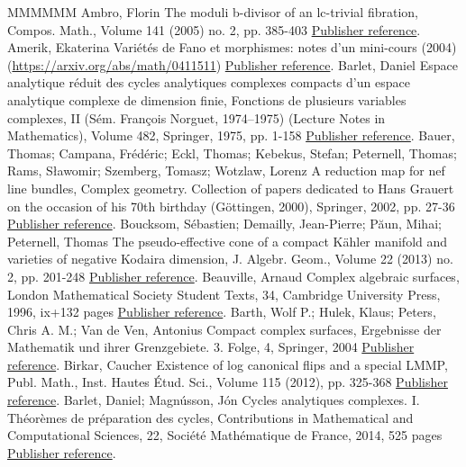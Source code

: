\documentclass[11pt]{article}
\theoremstyle{definition}
\numberwithin{equation}{section}
\numberwithin{figure}{section}
\numberwithin{table}{section}
\begin{document}
\begin{thebibliography}{MMMMMM}
 Ambro, Florin The moduli b-divisor of an lc-trivial fibration, Compos. Math., Volume 141 (2005) no. 2, pp. 385-403 \href{https://ahl.centre-mersenne.org/item/AHL_2020__3__473_0/#Amb05a}{Publisher reference}.
 Amerik, Ekaterina Variétés de Fano et morphismes: notes d’un mini-cours (2004) (\url{https://arxiv.org/abs/math/0411511}) \href{https://ahl.centre-mersenne.org/item/AHL_2020__3__473_0/#Ame04}{Publisher reference}.
 Barlet, Daniel Espace analytique réduit des cycles analytiques complexes compacts d’un espace analytique complexe de dimension finie, Fonctions de plusieurs variables complexes, II (Sém. François Norguet, 1974–1975) (Lecture Notes in Mathematics), Volume 482, Springer, 1975, pp. 1-158 \href{https://ahl.centre-mersenne.org/item/AHL_2020__3__473_0/#Bar75}{Publisher reference}.
 Bauer, Thomas; Campana, Frédéric; Eckl, Thomas; Kebekus, Stefan; Peternell, Thomas; Rams, Sławomir; Szemberg, Tomasz; Wotzlaw, Lorenz A reduction map for nef line bundles, Complex geometry. Collection of papers dedicated to Hans Grauert on the occasion of his 70th birthday (Göttingen, 2000), Springer, 2002, pp. 27-36 \href{https://ahl.centre-mersenne.org/item/AHL_2020__3__473_0/#BCE+}{Publisher reference}.
 Boucksom, Sébastien; Demailly, Jean-Pierre; Păun, Mihai; Peternell, Thomas The pseudo-effective cone of a compact Kähler manifold and varieties of negative Kodaira dimension, J. Algebr. Geom., Volume 22 (2013) no. 2, pp. 201-248 \href{https://ahl.centre-mersenne.org/item/AHL_2020__3__473_0/#BDPP}{Publisher reference}.
 Beauville, Arnaud Complex algebraic surfaces, London Mathematical Society Student Texts, 34, Cambridge University Press, 1996, ix+132 pages \href{https://ahl.centre-mersenne.org/item/AHL_2020__3__473_0/#Bea96}{Publisher reference}.
 Barth, Wolf P.; Hulek, Klaus; Peters, Chris A. M.; Van de Ven, Antonius Compact complex surfaces, Ergebnisse der Mathematik und ihrer Grenzgebiete. 3. Folge, 4, Springer, 2004 \href{https://ahl.centre-mersenne.org/item/AHL_2020__3__473_0/#BHPV04}{Publisher reference}.
 Birkar, Caucher Existence of log canonical flips and a special LMMP, Publ. Math., Inst. Hautes Étud. Sci., Volume 115 (2012), pp. 325-368 \href{https://ahl.centre-mersenne.org/item/AHL_2020__3__473_0/#Bir12}{Publisher reference}.
 Barlet, Daniel; Magnússon, Jón Cycles analytiques complexes. I. Théorèmes de préparation des cycles, Contributions in Mathematical and Computational Sciences, 22, Société Mathématique de France, 2014, 525 pages \href{https://ahl.centre-mersenne.org/item/AHL_2020__3__473_0/#BM14}{Publisher reference}.

\end{thebibliography}
\end{document}

